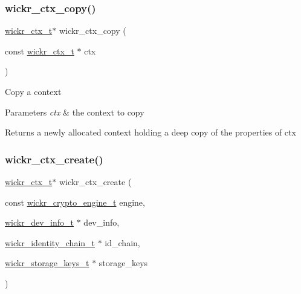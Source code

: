 \subsubsection{\texorpdfstring{wickr\+\_\+ctx\+\_\+copy()}{wickr\_ctx\_copy()}}
{\footnotesize\ttfamily \mbox{\hyperlink{structwickr__ctx}{wickr\+\_\+ctx\+\_\+t}}$\ast$ wickr\+\_\+ctx\+\_\+copy (\begin{DoxyParamCaption}\item[{const \mbox{\hyperlink{structwickr__ctx}{wickr\+\_\+ctx\+\_\+t}} $\ast$}]{ctx }\end{DoxyParamCaption})}

Copy a context


\begin{DoxyParams}{Parameters}
{\em ctx} & the context to copy \\
\hline
\end{DoxyParams}
\begin{DoxyReturn}{Returns}
a newly allocated context holding a deep copy of the properties of \textquotesingle{}ctx\textquotesingle{} 
\end{DoxyReturn}
\mbox{\label{group__wickr__ctx_ga085975d71519bf5729a7cf264a5f7876}} 
\subsubsection{\texorpdfstring{wickr\+\_\+ctx\+\_\+create()}{wickr\_ctx\_create()}}
{\footnotesize\ttfamily \mbox{\hyperlink{structwickr__ctx}{wickr\+\_\+ctx\+\_\+t}}$\ast$ wickr\+\_\+ctx\+\_\+create (\begin{DoxyParamCaption}\item[{const \mbox{\hyperlink{structwickr__crypto__engine}{wickr\+\_\+crypto\+\_\+engine\+\_\+t}}}]{engine,  }\item[{\mbox{\hyperlink{structwickr__dev__info}{wickr\+\_\+dev\+\_\+info\+\_\+t}} $\ast$}]{dev\+\_\+info,  }\item[{\mbox{\hyperlink{structwickr__identity__chain}{wickr\+\_\+identity\+\_\+chain\+\_\+t}} $\ast$}]{id\+\_\+chain,  }\item[{\mbox{\hyperlink{structwickr__storage__keys}{wickr\+\_\+storage\+\_\+keys\+\_\+t}} $\ast$}]{storage\+\_\+keys }\end{DoxyParamCaption})}

